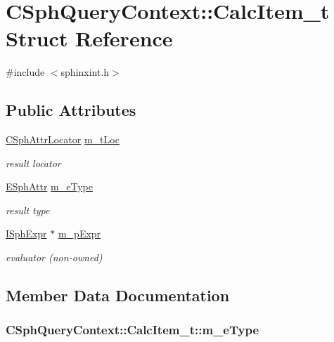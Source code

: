 \hypertarget{structCSphQueryContext_1_1CalcItem__t}{\section{C\-Sph\-Query\-Context\-:\-:Calc\-Item\-\_\-t Struct Reference}
\label{structCSphQueryContext_1_1CalcItem__t}
}


{\ttfamily \#include $<$sphinxint.\-h$>$}

\subsection*{Public Attributes}
\begin{DoxyCompactItemize}
\item 
\hyperlink{structCSphAttrLocator}{C\-Sph\-Attr\-Locator} \hyperlink{structCSphQueryContext_1_1CalcItem__t_a3d222a3adb204a33585116222ddbabed}{m\-\_\-t\-Loc}
\begin{DoxyCompactList}\small\item\em result locator \end{DoxyCompactList}\item 
\hyperlink{sphinxexpr_8h_aa883df0db2e4468a107fdd2d2ae625a3}{E\-Sph\-Attr} \hyperlink{structCSphQueryContext_1_1CalcItem__t_a5de2d59730f3707d6a5486ba471a7d11}{m\-\_\-e\-Type}
\begin{DoxyCompactList}\small\item\em result type \end{DoxyCompactList}\item 
\hyperlink{structISphExpr}{I\-Sph\-Expr} $\ast$ \hyperlink{structCSphQueryContext_1_1CalcItem__t_ab43f4c6e05f47dade4f042a77016af4f}{m\-\_\-p\-Expr}
\begin{DoxyCompactList}\small\item\em evaluator (non-\/owned) \end{DoxyCompactList}\end{DoxyCompactItemize}


\subsection{Member Data Documentation}
\hypertarget{structCSphQueryContext_1_1CalcItem__t_a5de2d59730f3707d6a5486ba471a7d11}{
\subsubsection[{m\-\_\-e\-Type}]{ C\-Sph\-Query\-Context\-::\-Calc\-Item\-\_\-t\-::m\-\_\-e\-Type}}\label{structCSphQueryContext_1_1CalcItem__t_a5de2d59730f3707d6a5486ba471a7d11}


